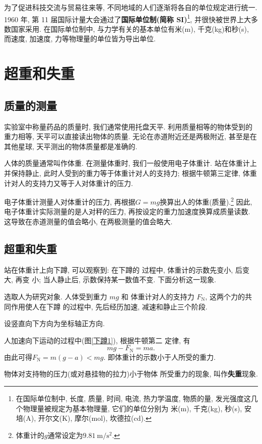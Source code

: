 \documentclass[11pt,a4paper]{ctexbook}
\newcommand{\unit}[1]{\ \mathrm{#1}}
\begin{document}
为了促进科技交流与贸易往来等, 不同地域的人们逐渐将各自的单位规定进行统一.
1960 年, 第 11 届国际计量大会通过了\textbf{国际单位制(简称 SI)}\footnote{在国际单位制中, 长度, 质量, 时间, 电流, 热力学温度, 物质的量, 发光强度这几个物理量被规定为基本物理量, 它们的单位分别为
米(m), 千克(kg), 秒(s), 安培(A), 开尔文(K), 摩尔(mol), 坎德拉(cd).},
并很快被世界上大多数国家采用.
在国际单位制中, 与力学有关的基本单位有米(m), 千克(kg)和秒(s),
而速度, 加速度, 力等物理量的单位皆为导出单位.

\section{超重和失重}

\subsection*{质量的测量}
实验室中称量药品的质量时, 我们通常使用托盘天平.
利用质量相等的物体受到的重力相等, 天平可以直接读出物体的质量.
无论在赤道附近还是两极附近, 甚至是在其他星球, 天平测出的物体质量都是准确的.

人体的质量通常叫作体重. 在测量体重时, 我们一般使用电子体重计.
站在体重计上并保持静止, 此时人受到的重力等于体重计对人的支持力;
根据牛顿第三定律, 体重计对人的支持力又等于人对体重计的压力.

电子体重计测量人对体重计的压力, 再根据$G = mg$换算出人的体重(质量).\footnote{体重计的$g$通常设定为$9.81\unit{m/s^2}$.}
因此, 电子体重计实际测量的是人对秤的压力, 再按设定的重力加速度换算成质量读数.
这导致在赤道测量的值会略小, 在两极测量的值会略大.

\subsection*{超重和失重}
站在体重计上向下蹲, 可以观察到: 在下蹲的
过程中, 体重计的示数先变小, 后变大, 再变
小; 当人静止后, 示数保持某一数值不变. 下面分析这一现象.

选取人为研究对象. 人体受到重力 $mg$ 和
体重计对人的支持力 $F_\text{N}$, 这两个力的共同作用使人在下蹲
的过程中, 先后经历加速, 减速和静止三个阶段.

设竖直向下方向为坐标轴正方向.

人加速向下运动的过程中(图\ref{下蹲1}), 根据牛顿第二
定律, 有
$$mg - F_\text{N} = ma.$$
由此可得$F_\text{N} = m(g-a)<mg.$
即体重计的示数小于人所受的重力.

物体对支持物的压力(或对悬挂物的拉力)小于物体
所受重力的现象, 叫作\textbf{失重}现象.
\end{document}
